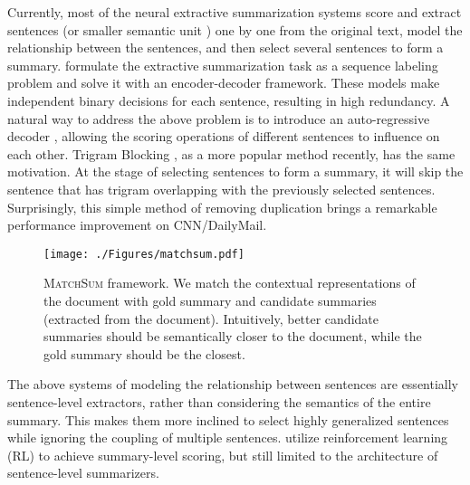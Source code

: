 \documentclass[11pt,a4paper]{article}
\begin{document}
Currently, most of the neural extractive summarization systems score and extract sentences (or smaller semantic unit \cite{xu2019discourse}) one by one from the original text, model the relationship between the sentences, and then select several sentences to form a summary. \citet{cheng2016neural, nallapati2017summarunner} formulate the extractive summarization task as a sequence labeling problem and solve it with an encoder-decoder framework. These models make independent binary decisions for each sentence, resulting in high redundancy. A natural way to address the above problem is to introduce an auto-regressive decoder \cite{chen2018fast, jadhav2018extractive, zhou2018neural}, allowing the scoring operations of different sentences to influence on each other. Trigram Blocking \cite{paulus2017deep,liu2019text}, as a more popular method recently, has the same motivation. At the stage of selecting sentences to form a summary, it will skip the sentence that has trigram overlapping with the previously selected sentences. Surprisingly, this simple method of removing duplication brings a remarkable performance improvement on CNN/DailyMail.


\begin{figure}
    \centering
    \texttt{[image: ./Figures/matchsum.pdf]}
    \caption{\textsc{MatchSum} framework. We match the contextual representations of the document with gold summary and candidate summaries (extracted from the document). Intuitively, better candidate summaries should be semantically closer to the document, while the gold summary should be the closest.}
    \label{fig:framework}
\end{figure}


The above systems of modeling the relationship between sentences are essentially sentence-level extractors, rather than considering the semantics of the entire summary. This makes them more inclined to select highly generalized sentences while ignoring the coupling of multiple sentences. \citet{narayan2018ranking,bae2019summary} utilize reinforcement learning (RL) to achieve summary-level scoring, but still limited to the architecture of sentence-level summarizers.
\end{document}
